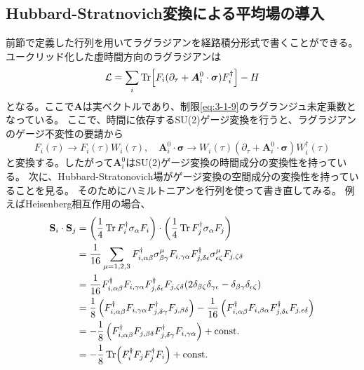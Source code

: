 \documentclass[11pt, aps, longbibliography]{article}
\begin{document}
    \subsection{Hubbard-Stratnovich変換による平均場の導入}
        前節で定義した行列を用いてラグラジアンを経路積分形式で書くことができる。ユークリッド化した虚時間方向のラグラジアンは
        \begin{equation}\label{eq:3-1-16}
            \mathcal{L} = \sum_i \Tr[F_i ( \partial_\tau + \boldsymbol{A}_i^0 \cdot \boldsymbol{\sigma} ) F_i^\dagger ] - H
        \end{equation}
        となる。ここで$\boldsymbol{A}$は実ベクトルであり、制限\eqref{eq:3-1-9}のラグランジュ未定乗数となっている。
        ここで、時間に依存するSU(2)ゲージ変換を行うと、ラグラジアンのゲージ不変性の要請から
        \begin{equation}\label{eq:3-1-17}
            F_i(\tau) \rightarrow F_i(\tau) W_i(\tau), \quad \boldsymbol{A}_i^0 \cdot \boldsymbol{\sigma} \rightarrow W_i(\tau) (\partial_\tau + \boldsymbol{A}_i^0 \cdot \boldsymbol{\sigma}) W_i^\dagger(\tau)
        \end{equation}
        と変換する。したがって$\boldsymbol{A}_i^0$はSU(2)ゲージ変換の時間成分の変換性を持っている。
        次に、Hubbard-Stratonovich場がゲージ変換の空間成分の変換性を持っていることを見る。
        そのためにハミルトニアンを行列を使って書き直してみる。
        例えばHeisenberg相互作用の場合、
        \begin{align}\label{eq:3-1-10}
            \mathbf{S}_i \cdot \mathbf{S}_j &= \left( \frac{1}{4}\Tr F_i^\dagger \sigma_\alpha F_i \right) \cdot \left( \frac{1}{4}\Tr F_j^\dagger \sigma_\alpha F_j \right) \notag \\
            &= \frac{1}{16} \sum_{\mu=1,2,3}F_{i,\alpha\beta}^\dagger \sigma^\mu_{\beta\gamma}F_{i,\gamma\alpha}F_{j,\delta\epsilon}^\dagger \sigma^\mu_{\epsilon\zeta}F_{j,\zeta\delta} \notag \\
            &= \frac{1}{16} F_{i,\alpha\beta}^\dagger F_{i,\gamma\alpha}F_{j,\delta\epsilon}^\dagger F_{j,\zeta\delta} (2\delta_{\beta\zeta}\delta_{\gamma\epsilon}-\delta_{\beta\gamma}\delta_{\epsilon\zeta}) \notag \\
            &= \frac{1}{8}\left( F_{i,\alpha\beta}^\dagger F_{i,\gamma\alpha} F_{j,\delta\gamma}^\dagger F_{j,\beta\delta} \right) - \frac{1}{16}\left( F_{i,\alpha\beta}^\dagger F_{i,\beta\alpha}F_{j,\delta\epsilon}^\dagger F_{j,\epsilon\delta} \right) \notag \\
            &= -\frac{1}{8}\left( F_{i,\alpha\beta}^\dagger F_{j,\beta\delta} F_{j,\delta\gamma}^\dagger F_{i,\gamma\alpha}  \right) + \text{const.} \notag \\
            &= -\frac{1}{8}\Tr (F_i^\dagger F_j F_j^\dagger F_i)+ \text{const.}
        \end{align}
\end{document}

